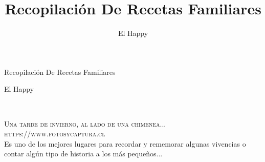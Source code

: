 \documentclass[10pt,a4paper]{report}
\title{Recopilación De Recetas Familiares}
\author{El Happy}
\begin{document}

\begingroup
\thispagestyle{empty}
\centering
\vspace*{5cm}
\par\normalfont\fontsize{35}{35}\sffamily\selectfont
{\LARGE Recopilación De Recetas Familiares}\par %
\vspace*{1cm}
{\Huge El Happy}\par %
\endgroup


\newpage
~\vfill
\thispagestyle{empty}


\noindent \textsc{Una tarde de invierno, al lado de una chimenea...}\\

\noindent \textsc{https://www.fotosycaptura.cl}\\ %

\noindent Es uno de los mejores lugares para recordar y rememorar algunas vivencias o contar algún tipo de historia a los más pequeños...\\ %
\end{document}
